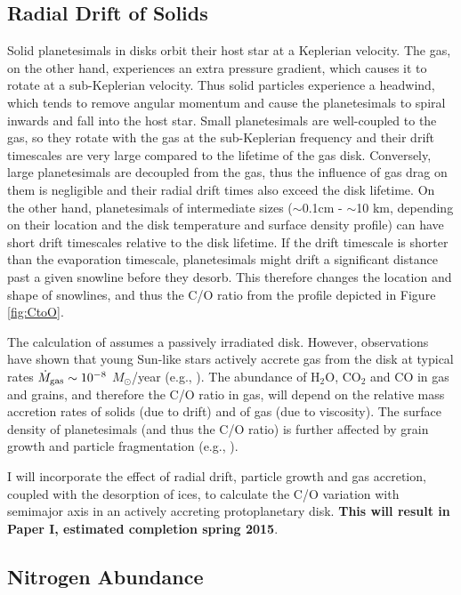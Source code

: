 \documentclass[manuscript]{aastex}
\begin{document}
\subsection{Radial Drift of Solids}
\label{sec:drift}

Solid planetesimals in disks orbit their host star at a Keplerian velocity. The gas, on the other hand, experiences an extra pressure gradient, which causes it to rotate at a sub-Keplerian velocity. Thus solid particles experience a headwind, which tends to remove angular momentum and cause the planetesimals to spiral inwards and fall into the host star. Small planetesimals are well-coupled to the gas, so they rotate with the gas at the sub-Keplerian frequency and their drift timescales are very large compared to the lifetime of the gas disk. Conversely, large planetesimals are decoupled from the gas, thus the influence of gas drag on them is negligible and their radial drift times also exceed the disk lifetime. On the other hand, planetesimals of intermediate sizes ($\sim$0.1cm - $\sim$10 km, depending on their location and the disk temperature and surface density profile) can have short drift timescales relative to the disk lifetime. If  the drift timescale is shorter than the evaporation timescale, planetesimals might drift a significant distance past a given snowline before they desorb. This therefore changes the location and shape of snowlines, and thus the C/O ratio from the profile depicted in Figure \ref{fig:CtoO}.

The calculation of \citet{oberg11} assumes a passively irradiated disk. However, observations have shown that young Sun-like stars actively accrete gas from the disk at typical rates $\dot{M}_{\rm gas} \sim 10^{-8}$ $M_{\odot}$/year (e.g., \citealt{hartmann06}). The abundance of H$_2$O, CO$_2$ and CO in gas and grains, and therefore the C/O ratio in gas, will depend on the relative mass accretion rates of solids (due to drift) and of gas (due to viscosity). The surface density of planetesimals (and thus the C/O ratio) is further affected by grain growth and particle fragmentation (e.g., \citealt{birnstiel12}).

I will incorporate the effect of radial drift, particle growth and gas accretion, coupled with the desorption of ices, to calculate the C/O variation with semimajor axis in an actively accreting protoplanetary disk. \textbf{This will result in Paper I, estimated completion spring 2015}.

\subsection{Nitrogen Abundance}
\label{sec:nitrogen}
\end{document}
